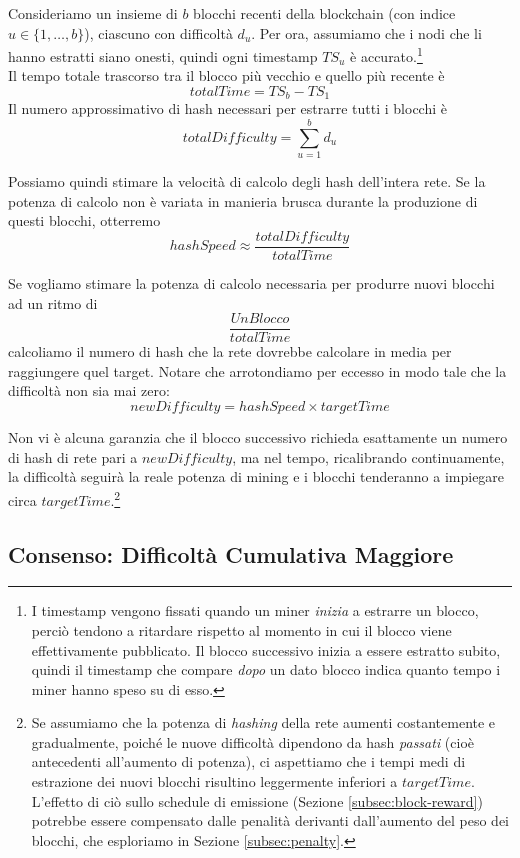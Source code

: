 Consideriamo un insieme di $b$ blocchi recenti della blockchain (con indice $u \in \{1,\dots,b\}$), ciascuno con difficoltà $d_u$. Per ora, assumiamo che i nodi che li hanno estratti siano onesti, quindi ogni timestamp ${TS}_u$ è accurato.\footnote{I timestamp vengono fissati quando un miner {\em inizia} a estrarre un blocco, perciò tendono a ritardare rispetto al momento in cui il blocco viene effettivamente pubblicato. Il blocco successivo inizia a essere estratto subito, quindi il timestamp che compare {\em dopo} un dato blocco indica quanto tempo i miner hanno speso su di esso.}\\Il tempo totale trascorso tra il blocco più vecchio e quello più recente è \[\mathit{totalTime} = {TS}_b - {TS}_1\] Il numero approssimativo di hash necessari per estrarre tutti i blocchi è \[\mathit{totalDifficulty} = \sum_{u=1}^b d_u\]

Possiamo quindi stimare la velocità di calcolo degli hash dell’intera rete. Se la potenza di calcolo non è variata in manieria brusca durante la produzione di questi blocchi, otterremo
\[\mathit{hashSpeed} \approx \frac{\mathit{totalDifficulty}}{\mathit{totalTime}}\]

Se vogliamo stimare la potenza di calcolo necessaria per produrre nuovi blocchi ad un ritmo di\\ \[\frac{\mathit{Un Blocco}}{\mathit{totalTime}}\] calcoliamo il numero di hash che la rete dovrebbe calcolare in media per raggiungere quel target. Notare che arrotondiamo per eccesso in modo tale che la difficoltà non sia mai zero:
\[\mathit{newDifficulty} = \mathit{hashSpeed} \times \mathit{targetTime}\]

Non vi è alcuna garanzia che il blocco successivo richieda esattamente un numero di hash di rete pari a $\mathit{newDifficulty}$, ma nel tempo, ricalibrando continuamente, la difficoltà seguirà la reale potenza di mining e i blocchi tenderanno a impiegare circa $\mathit{targetTime}$.\footnote{Se assumiamo che la potenza di \emph{hashing} della rete aumenti costantemente e gradualmente, poiché le nuove difficoltà dipendono da hash {\em passati} (cioè antecedenti all’aumento di potenza), ci aspettiamo che i tempi medi di estrazione dei nuovi blocchi risultino leggermente inferiori a $\mathit{targetTime}$. L’effetto di ciò sullo schedule di emissione (Sezione \ref{subsec:block-reward}) potrebbe essere compensato dalle penalità derivanti dall’aumento del peso dei blocchi, che esploriamo in Sezione \ref{subsec:penalty}.}


\subsection{Consenso: Difficoltà Cumulativa Maggiore}


